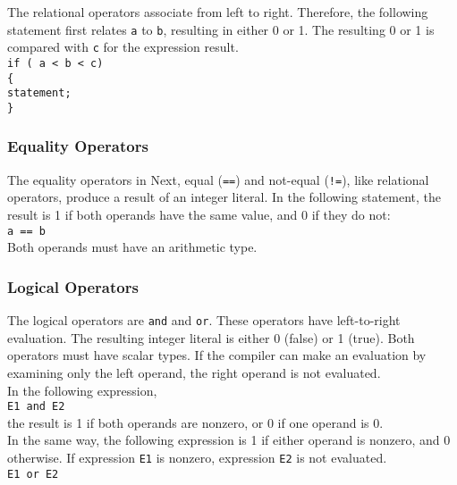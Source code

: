 \documentclass[12pt]{article}
\begin{document}
\noindent The relational operators associate from left to right.  Therefore, the following statement first relates \texttt{a} to \texttt{b}, resulting in either 0 or 1.  The resulting 0 or 1 is compared with \texttt{c} for the expression result. \\

\texttt{if ( a < b < c) \\
\indent \{ \\
\indent \indent statement; \\
\indent \} }

\subsubsection{Equality Operators}
The equality operators in Next, equal (\texttt{==}) and not-equal (\texttt{!=}), like relational operators, produce a result of an integer literal.  In the following statement, the result is 1 if both operands have the same value, and 0 if they do not: \\

\texttt{a == b} \\

\noindent  Both operands must have an arithmetic type.

\subsubsection{Logical Operators}
The logical operators are \texttt{and} and \texttt{or}.  These operators have left-to-right evaluation.  The resulting integer literal is either 0 (false) or 1 (true).  Both operators must have scalar types.  If the compiler can make an evaluation by examining only the left operand, the right operand is not evaluated. \\

\noindent In the following expression, \\

\texttt{E1 and E2} \\

\noindent the result is 1 if both operands are nonzero, or 0 if one operand is 0.\\

\noindent In the same way, the following expression is 1 if either operand is nonzero, and 0 otherwise.  If expression \texttt{E1} is nonzero, expression \texttt{E2} is not evaluated. \\

\texttt{E1 or E2}
\end{document}

